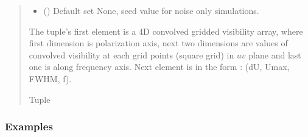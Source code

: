 \documentclass[a4paper,11pt,oneside,english,openany]{sphinxmanual}
\begin{document}
\begin{fulllineitems}
\begin{quote}
\begin{description}
\begin{itemize}
\item {} 
\sphinxAtStartPar
{} () \textendash{} Default set None, seed value for noise only simulations.

\end{itemize}

\sphinxAtStartPar
The tuple’s first element is a 4D convolved gridded visibility array, where first dimension is polarization axis, next two dimensions are values of convolved visibility at each grid points (square grid) in \(uv\) plane and last one is along frequency axis.
Next element is in the form : (dU, Umax, FWHM, f).

\sphinxAtStartPar
Tuple

\end{description}\end{quote}
\subsubsection*{Examples}


\end{fulllineitems}
\end{document}
